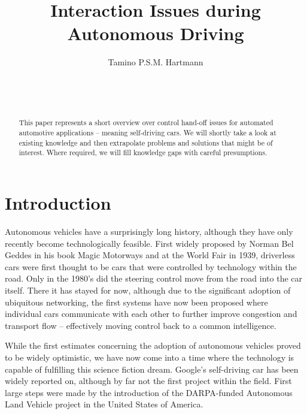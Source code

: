 \documentclass{acm_proc_article-sp}
\begin{document}

\title{Interaction Issues during Autonomous Driving}

\author{
\alignauthor
Tamino P.S.M. Hartmann\\
       \\
       \\
       \\
}

\maketitle
\begin{abstract}
This paper represents a short overview over control hand-off issues for automated automotive applications – meaning self-driving cars.
We will shortly take a look at existing knowledge and then extrapolate problems and solutions that might be of interest.
Where required, we will fill knowledge gaps with careful presumptions.
\end{abstract}


\section{Introduction}

Autonomous vehicles have a surprisingly long history, although they have only recently become technologically feasible.
First widely proposed by Norman Bel Geddes in his book Magic Motorways \cite{geddes2009magic} and at the World Fair in 1939, driverless cars were first thought to be cars that were controlled by technology within the road.
Only in the 1980's did the steering control move from the road into the car itself.
There it has stayed for now, although due to the significant adoption of ubiquitous networking, the first systems have now been proposed where individual cars communicate with each other to further improve congestion and transport flow – effectively moving control back to a common intelligence.

While the first estimates concerning the adoption of autonomous vehicles proved to be widely optimistic, we have now come into a time where the technology is capable of fulfilling this science fiction dream.
Google's self-driving car \cite{www:google_car} has been widely reported on, although by far not the first project within the field.
First large steps were made by the introduction of the DARPA-funded Autonomous Land Vehicle project in the United States of America.
\end{document}

